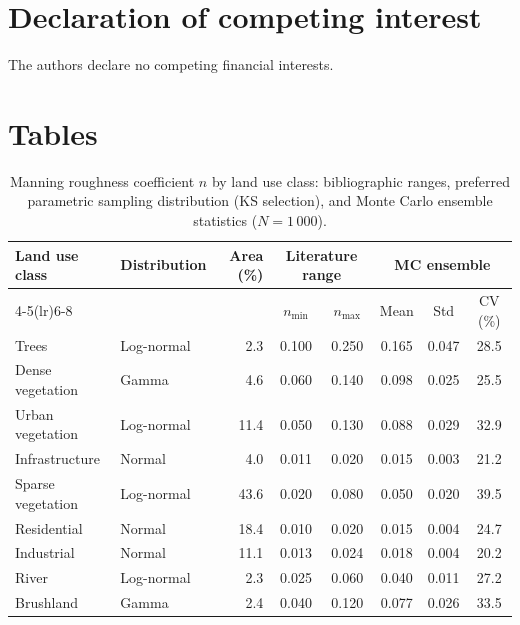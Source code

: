 \documentclass[review,12pt]{elsarticle}
\newcommand{\nman}{$n$}
\begin{document}
\section*{Declaration of competing interest}

The authors declare no competing financial interests.



\clearpage
\section*{Tables}

\begin{table}[htbp]
\centering
\caption{Manning roughness coefficient \nman{} by land use class:
bibliographic ranges, preferred parametric sampling distribution (KS selection), and
Monte Carlo ensemble statistics ($N = 1\,000$).}
\label{tab:manning}
\small
\begin{tabular}{llrccccc}
\toprule
\multirow{2}{*}{Land use class} &
\multirow{2}{*}{Distribution} &
\multirow{2}{*}{Area (\%)} &
\multicolumn{2}{c}{Literature range} &
\multicolumn{3}{c}{MC ensemble} \\
\cmidrule(lr){4-5}\cmidrule(lr){6-8}
& & & $n_{\min}$ & $n_{\max}$ & Mean & Std & CV (\%) \\
\midrule
Trees             & Log-normal &  2.3 & 0.100 & 0.250 & 0.165 & 0.047 & 28.5 \\
Dense vegetation  & Gamma      &  4.6 & 0.060 & 0.140 & 0.098 & 0.025 & 25.5 \\
Urban vegetation  & Log-normal & 11.4 & 0.050 & 0.130 & 0.088 & 0.029 & 32.9 \\
Infrastructure    & Normal     &  4.0 & 0.011 & 0.020 & 0.015 & 0.003 & 21.2 \\
Sparse vegetation & Log-normal & 43.6 & 0.020 & 0.080 & 0.050 & 0.020 & 39.5 \\
Residential       & Normal     & 18.4 & 0.010 & 0.020 & 0.015 & 0.004 & 24.7 \\
Industrial        & Normal     & 11.1 & 0.013 & 0.024 & 0.018 & 0.004 & 20.2 \\
River             & Log-normal &  2.3 & 0.025 & 0.060 & 0.040 & 0.011 & 27.2 \\
Brushland         & Gamma      &  2.4 & 0.040 & 0.120 & 0.077 & 0.026 & 33.5 \\
\bottomrule
\end{tabular}
\end{table}
\end{document}
